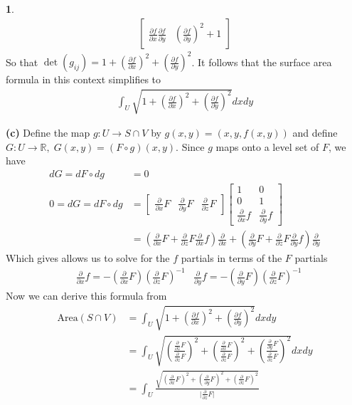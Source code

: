 \documentclass[10.5pt]{article}
\theoremstyle{definition}
\newtheorem{pb}{}
\newcommand{\abs}[1]{\lvert#1\rvert}
\newcommand{\parx}{\frac{\partial}{\partial x}}
\newcommand{\pary}{\frac{\partial}{\partial y}}
\newcommand{\parz}{\frac{\partial}{\partial z}}
\begin{document}
\begin{pb}
\begin{align*}
\begin{bmatrix}
                \frac{\partial f}{\partial x} \frac{\partial f}{\partial y} &
                \left(\frac{\partial f}{\partial y}\right)^2 + 1
             \end{bmatrix}
        \end{align*}
        So that \(\det(g_{ij}) = 1 + \left(\frac{\partial f}{\partial x}\right)^2 + \left( \frac{\partial f}{\partial y}\right)^2\). It follows that the surface area formula in this context simplifies to
        \begin{align*}
            \int_U \sqrt{1 + \left(\frac{\partial f}{\partial x}\right)^2 + \left( \frac{\partial f}{\partial y}\right)^2} dxdy
        \end{align*}

        \textbf{(c)} 
        Define the map \(g: U \to S \cap V\) by \(g(x,y) = (x,y,f(x,y))\) and define \(G: U \to \mathbb{R}, \; G(x,y) = (F \circ g)(x,y)\). Since \(g\) maps onto a level set of \(F\), we have
        \begin{align*}
            dG = dF \circ d g &= 0 \\
            0 = dG = dF \circ d g &= \begin{bmatrix} \parx F & \pary F & \parz F \end{bmatrix}\begin{bmatrix} 1 & 0 \\ 0 & 1 \\ \parx f & \pary f \end{bmatrix} \\
            &= \left( \parx F + \parz F \parx f \right)\parx + \left( \pary F + \parz F \pary f \right)\pary
        \end{align*}
        Which gives allows us to solve for the \(f\) partials in terms of the \(F\) partials
        \begin{align*}
            &\parx f = - \left(\parx F\right)\left(\parz F\right)^{-1} &\pary f = - \left(\pary F\right)\left(\parz F\right)^{-1}
        \end{align*}
        Now we can derive this formula from 
        \begin{align*}
            \text{Area}(S\cap V) &= \int_U \sqrt{1 + \left(\frac{\partial f}{\partial x}\right)^2 + \left( \frac{\partial f}{\partial y}\right)^2} dxdy \\
            &= \int_U \sqrt{\left(\frac{\parz F}{\parz F}\right)^2 + \left(\frac{\parx F}{\parz F}\right)^2 + \left(\frac{\pary F}{\parz F}\right)^2} dxdy \\
            &= \int_U \frac{\sqrt{\left(\parx F\right)^2 + \left(\pary F\right)^2 + \left(\parz F\right)^2}}{\abs{\parz F}} \\

\end{align*}
\end{pb}
\end{document}
